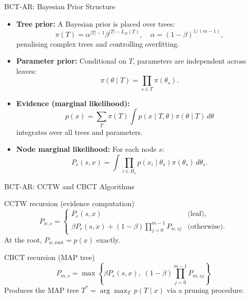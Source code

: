 \documentclass[10pt]{beamer}
\begin{document}
\begin{frame}{BCT-AR: Bayesian Prior Structure}
\begin{itemize}
    \item \textbf{Tree prior:} A Bayesian prior is placed over trees:
    \[
    \pi(T)=\alpha^{|T|-1}\beta^{|T|-L_D(T)}, \quad \alpha=(1-\beta)^{1/(m-1)},
    \]
    penalising complex trees and controlling overfitting.

    \item \textbf{Parameter prior:} Conditional on $T$, parameters are independent across leaves:
    \[
    \pi(\theta \mid T)=\prod_{s\in T}\pi(\theta_s).
    \]

    \item \textbf{Evidence (marginal likelihood):}
    \[
    p(x)=
    \sum_{T} \pi(T) \int p(x \mid T,\theta)\pi(\theta \mid T)\,d\theta
    \]
    integrates over all trees and parameters.

    \item \textbf{Node marginal likelihood:} For each node $s$:
    \[
    P_e(s,x)=
    \int \prod_{i\in B_s} p(x_i \mid \theta_s)\pi(\theta_s)\,d\theta_s.
    \]
\end{itemize}
\end{frame}

\begin{frame}{BCT-AR: CCTW and CBCT Algorithms}
\begin{block}{CCTW recursion (evidence computation)}
\[
P_{w,s}=
\begin{cases}
P_e(s,x) & \text{(leaf)},\\
\beta P_e(s,x) + (1-\beta)\prod_{j=0}^{m-1}P_{w,sj} & \text{(otherwise)}.
\end{cases}
\]
At the root, $P_{w,\text{root}} = p(x)$ exactly.
\end{block}

\begin{block}{CBCT recursion (MAP tree)}
\[
P_{m,s}=
\max\left\{
\beta P_e(s,x),\;
(1-\beta)\prod_{j=0}^{m-1}P_{m,sj}
\right\}
\]
Produces the MAP tree $T^* = \arg\max_T\, p(T \mid x)$ via a pruning procedure.
\end{block}
\end{frame}
\end{document}
